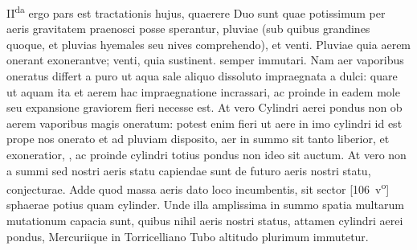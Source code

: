  \pstart  II\textsuperscript{da} ergo pars est tractationis hujus, quaerere \protect{}\protect{}  Duo sunt quae potissimum per aeris gravitatem\protect{} praenosci posse sperantur, pluviae  (sub quibus grandines quoque, et pluvias hyemales  seu nives comprehendo), et venti. Pluviae quia  aerem onerant exonerantve; venti, quia sustinent.   semper immutari. Nam aer vaporibus oneratus differt  a puro ut aqua sale\protect{} aliquo dissoluto impraegnata  a dulci: quare ut aquam ita et aerem hac impraegnatione incrassari, ac proinde in eadem mole seu expansione  graviorem fieri necesse est. At vero Cylindri aerei  pondus non  ob aerem vaporibus magis oneratum:  potest enim fieri  ut aere in imo cylindri id est  prope nos onerato et ad pluviam disposito,  aer in summo sit tanto liberior, et exoneratior, , ac proinde cylindri totius pondus  non ideo  sit auctum. At vero non a summi  sed nostri aeris statu capiendae sunt de futuro  aeris nostri statu, conjecturae. Adde quod massa\protect{} aeris dato loco incumbentis, sit sector
  [106~v\textsuperscript{o}]  sphaerae potius quam cylinder. Unde illa  amplissima in summo spatia multarum  mutationum capacia sunt, quibus nihil  aeris nostri status, attamen cylindri  aerei pondus, Mercuriique\protect{} in Torricelliano Tubo\protect{}  altitudo plurimum immutetur.
\pend 